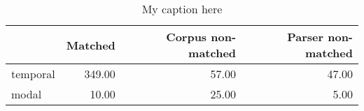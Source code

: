 \begin{table}[!ht]
\centering
\begin{tabular}{lrrr}
\toprule
{} &  Matched &  Corpus non-matched &  Parser non-matched \\
\midrule
temporal &   349.00 &               57.00 &               47.00 \\
modal    &    10.00 &               25.00 &                5.00 \\
\bottomrule
\end{tabular}
\caption{My caption here}
\label{tab:DEICTICITY-ocd-data}
\end{table}